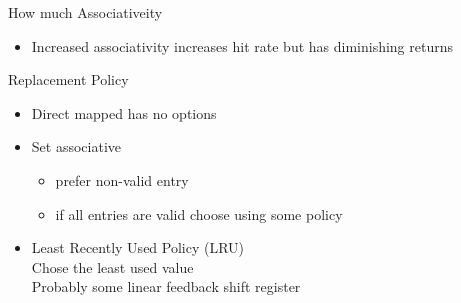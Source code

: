 \documentclass{report}
\begin{document}
\begin{description}
\begin{itemize}
        \end{itemize}
    \item {\large How much Associativeity}
        \begin{itemize}
            \item Increased associativity increases hit rate
                but has diminishing returns
        \end{itemize}
        \pagebreak
    \item {\large Replacement Policy}
       \begin{itemize}
           \item Direct mapped has no options
           \item Set associative
               \begin{itemize}
                   \item prefer non-valid entry
                   \item if all entries are valid choose using
                       some policy
               \end{itemize}
           \item Least Recently Used Policy (LRU)
               \\
               Chose the least used value\\
               Probably some linear feedback shift register 
       \end{itemize} 
    \item {\large}
\end{description}
\end{document}
